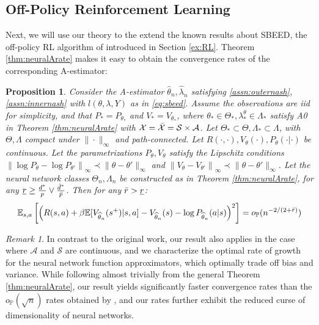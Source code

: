 \documentclass[12pt]{article}
\theoremstyle{myplain}
\newtheorem{proposition}{Proposition}[section]
\theoremstyle{definition}
\theoremstyle{definition}
\theoremstyle{remark}
\newtheorem{remark}{Remark}[section]
\numberwithin{equation}{section}
\begin{document}
\subsection{Off-Policy Reinforcement Learning} \label{app:RL}

Next, we will use our theory to the extend the known results about SBEED, the off-policy RL algorithm of \cite{sbeed} introduced in Section \ref{ex:RL}. Theorem \ref{thm:neuralArate} makes it easy to obtain the convergence rates of the corresponding A-estimator:
\begin{proposition}\label{thm:sbeedrates}
Consider the A-estimator $\widehat{\theta}_n, \widehat{\lambda}_n$ satisfying \ref{assn:outernash},\ref{assn:innernash} with $l(\theta, \lambda, Y)$ as in \ref{eq:sbeed}. Assume the observations are iid for simplicity, and that $P_*=P_{\theta_*}$ and $V_*=V_{\theta_*}$, where $\theta_*\in\Theta_*,\lambda_*^\theta\in\Lambda_*$ satisfy A0 in Theorem \ref{thm:neuralArate} with $\mathcal{X}=\Bar{\mathcal{X}}=\mathcal{S}\times\mathcal{A}$. Let $\Theta_*\subset\Theta,\Lambda_*\subset\Lambda$, with $\Theta,\Lambda$ compact under $\|\cdot\|_\infty$ and path-connected. Let $R(\cdot, \cdot), V_\theta(\cdot), P_\theta(\cdot|\cdot)$ be continuous. Let the parametrizations $P_\theta, V_\theta$ satisfy the Lipschitz conditions $\left\|\log P_\theta-\log P_{\theta'}\right\|_\infty\prec \|\theta-\theta'\|_\infty$ and $\left\|V_\theta-V_{\theta'}\right\|_\infty\prec \|\theta-\theta'\|_\infty$. Let the neural network classes $\Theta_n, \Lambda_n$ be constructed as in Theorem \ref{thm:neuralArate}, for any $\underline{r}\geq \frac{d^*}{p} \vee \frac{\Bar{d}^*}{\Bar{p}}$. Then for any $\Bar{r}>\underline{r}$:
$$\mathbb{E}_{s,a}\left[\left(R(s,a) +\beta \mathbb{E}[V_{\widehat{\theta}_n}(s^+)|s, a] - V_{\widehat{\theta}_n}(s)-\log P_{\widehat{\theta}_n}(a|s)\right)^2\right] = o_\mathbb{P}(n^{-2/(2+\Bar{r})})$$
\end{proposition}
\begin{remark}
In contrast to the original work, our result also applies in the case where $\mathcal{A}$ and $\mathcal{S}$ are continuous, and we characterize the optimal rate of growth for the neural network function approximators, which optimally trade off bias and variance. While following almost trivially from the general Theorem \ref{thm:neuralArate}, our result yields significantly faster convergence rates than the $o_\mathbb{P}(\sqrt{n})$ rates obtained by \cite{sbeed}, and our rates further exhibit the reduced curse of dimensionality of neural networks. 
\end{remark}
\end{document}

